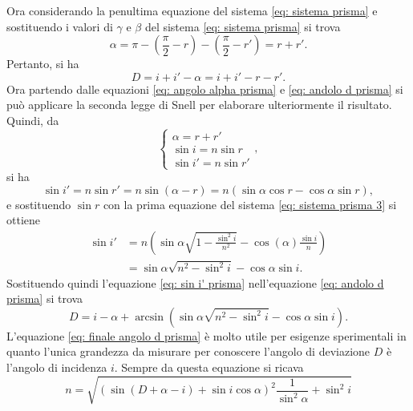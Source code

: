Ora considerando la penultima equazione del sistema \eqref{eq: sistema prisma} e sostituendo i valori di $\gamma$ e $\beta$ del sistema \eqref{eq: sistema prisma} si trova
\begin{equation}
    \label{eq: angolo alpha prisma}
    \alpha=\pi-\left(\frac{\pi}{2}-r\right)-\left(\frac{\pi}{2}-r'\right)=r+r'.
\end{equation}
Pertanto, si ha
\begin{equation}
    \label{eq: andolo d prisma}
    D=i+i'-\alpha=i+i'-r-r'.
\end{equation}
Ora partendo dalle equazioni \eqref{eq: angolo alpha prisma} e \eqref{eq: andolo d prisma} si può applicare la seconda legge di Snell per elaborare ulteriormente il risultato. Quindi, da
\begin{equation}
    \label{eq: sistema prisma 3}
    \begin{cases}
        \alpha=r+r' \\
        \sin{i}=n\sin{r} \\
        \sin{i'}=n\sin{r'}
    \end{cases},
\end{equation}
si ha 
\begin{equation}
    \sin{i'}=n\sin{r'}=n\sin{(\alpha-r)}=n(\sin{\alpha}\cos{r}-\cos{\alpha}\sin{r}),
\end{equation}
e sostituendo $\sin{r}$ con la prima equazione del sistema \eqref{eq: sistema prisma 3} si ottiene
\begin{equation}
    \begin{split}
    \label{eq: sin i' prisma}
    \sin{i'}&=n\left(\sin{\alpha}\sqrt{1-\frac{\sin^2{i}}{n^2}}-\cos{(\alpha)}\frac{\sin{i}}{n}\right) \\
    &=\sin{\alpha}\sqrt{n^2-\sin^2{i}}-\cos{\alpha}\sin{i}.
    \end{split}    
\end{equation}
Sostituendo quindi l'equazione \eqref{eq: sin i' prisma} nell'equazione \eqref{eq: andolo d prisma} si trova
\begin{equation}
    \label{eq: finale angolo d prisma}
    D=i-\alpha+\arcsin{\left(\sin{\alpha}\sqrt{n^2-\sin^2{i}}-\cos{\alpha}\sin{i}\right)}.
\end{equation}
L'equazione \eqref{eq: finale angolo d prisma} è molto utile per esigenze sperimentali in quanto l'unica grandezza da misurare per conoscere l'angolo di deviazione $D$ è l'angolo di incidenza $i$. Sempre da questa equazione si ricava
\begin{equation}
    \label{eq: indice rifrazione prisma generale}
    n=\sqrt{ \left(\sin{(D+\alpha-i)}+\sin{i}\cos{\alpha}\right)^2\frac{1}{\sin^2{\alpha}}+\sin^2{i}}
\end{equation}
